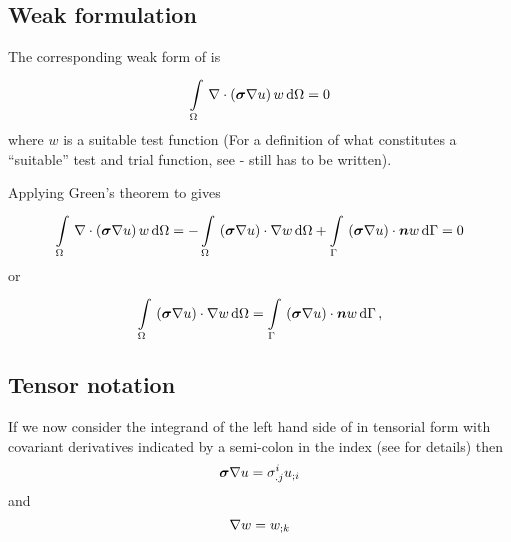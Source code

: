 \subsection{Weak formulation}

The corresponding weak form of  is
\begin{equation}
  \gint{\Omega}{}{\divergence{}{\pbrac{\tensor{\sigma}\gradient{}{u}}}w}{\Omega}=0 
  \label{eqn:LaplaceWeakForm}
\end{equation}
where $w$ is a suitable test function (For a definition of what constitutes a
``suitable'' test and trial function, see \secref{} - still has to be written).

Applying Green's theorem to  gives
\begin{equation}
 \gint{\Omega}{}{\divergence{}{\pbrac{\tensor{\sigma}\gradient{}{u}}}w}{\Omega}
 = -\gint{\Omega}{}{\dotprod{\pbrac{\tensor{\sigma}\gradient{}{u}}}{\gradient{}{w}}}{\Omega}
   +\gint{\Gamma}{}{\dotprod{\pbrac{\tensor{\sigma}\gradient{}{u}}}{\vectr{n}}w}{\Gamma}
 = 0
\end{equation}
or
\begin{equation}
  \gint{\Omega}{}{\dotprod{\pbrac{\tensor{\sigma}\gradient{}{u}}}{\gradient{}{w}}}{\Omega}
  = \gint{\Gamma}{}{\dotprod{\pbrac{\tensor{\sigma}\gradient{}{u}}}{\vectr{n}w}}{\Gamma} \,,
  \label{eqn:LaplaceWeightedResidualForm}
\end{equation}

\subsection{Tensor notation}

If we now consider the integrand of the left hand side of
 in tensorial form with covariant
derivatives indicated by a semi-colon in the index
(see  for details) then
\begin{equation}
  \tensor{\sigma}\gradient{}{u} = \sigma^{i}_{.j}\covarderiv{u}{i}
  \label{eqn:LaplaceWeakFormFactor1}
\end{equation}
and
\begin{equation}
  \gradient{}{w} = \covarderiv{w}{k}
  \label{eqn:LaplaceWeakFormFactor2}
\end{equation}

